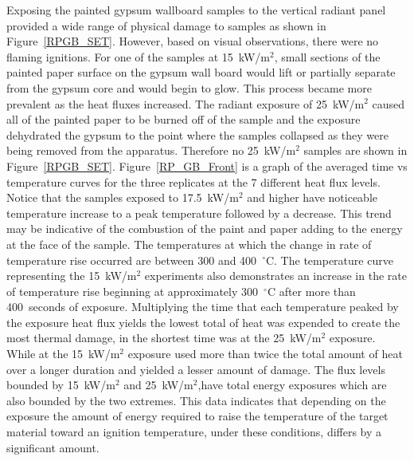 \documentclass[twoside]{uocthesis}
\begin{document}
{Exposing the painted gypsum wallboard samples to the vertical radiant panel provided a wide range of physical damage to samples as shown in Figure~\ref{RPGB_SET}.  However, based on visual observations, there were no flaming ignitions.  For one of the samples at 15~kW/m$^2$, small sections of the painted paper surface on the gypsum wall board would lift or partially separate from the gypsum core and would begin to glow.  This process became more prevalent as the heat fluxes increased.  The radiant exposure of 25~kW/m$^2$ caused all of the painted paper to be burned off of the sample and the exposure dehydrated the gypsum to the point where the samples collapsed as they were being removed from the apparatus.  Therefore no 25~kW/m$^2$ samples are shown in Figure~\ref{RPGB_SET}.   Figure~\ref{RP_GB_Front} is a graph of the averaged time vs temperature curves for the three replicates at the 7 different heat flux levels.  Notice that the samples exposed to 17.5~kW/m$^2$ and higher have noticeable temperature increase to a peak temperature followed by a decrease.  This trend may be indicative of the combustion of the paint and paper adding to the energy at the face of the sample. The temperatures at which the change in rate of temperature rise occurred are between 300 and 400~$^{\circ}$C.  The temperature curve representing the 15~kW/m$^2$ experiments also demonstrates an increase in the rate of temperature rise beginning at approximately 300~$^{\circ}$C after more than 400~seconds of exposure.  Multiplying the time that each temperature peaked by the exposure heat flux yields the lowest total of heat was expended to create the most thermal damage, in the shortest time was at the 25~kW/m$^2$ exposure.  While at the 15~kW/m$^2$ exposure used more than twice the total amount of heat over a longer duration and yielded a lesser amount of damage.  The flux levels bounded by 15~kW/m$^2$ and 25~kW/m$^2$,have total energy exposures which are also bounded by the two extremes. This data indicates that depending on the exposure the amount of energy required to raise the temperature of the target material toward an ignition temperature, under these conditions, differs by a significant amount.        
  
}
\end{document}

